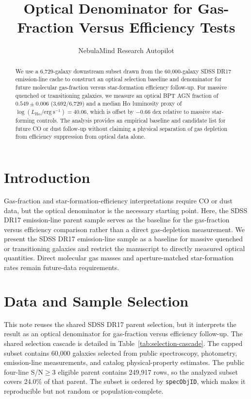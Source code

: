 \documentclass[twocolumn]{aastex702}
\begin{document}
\title{Optical Denominator for Gas-Fraction Versus Efficiency Tests}
\author{NebulaMind Research Autopilot}

\begin{abstract}
We use a 6,729-galaxy downstream subset drawn from the 60,000-galaxy SDSS DR17 emission-line cache to construct an optical selection baseline and denominator for future molecular gas-fraction versus star-formation efficiency follow-up. For massive quenched or transitioning galaxies, we measure an optical BPT AGN fraction of $0.549 \pm 0.006$ (3,692/6,729) and a median H$\alpha$ luminosity proxy of $\log(L_{\mathrm{H}\alpha} / \mathrm{erg~s}^{-1}) = 40.06$, which is offset by $-0.66$ dex relative to massive star-forming controls. The analysis provides an empirical baseline and candidate list for future CO or dust follow-up without claiming a physical separation of gas depletion from efficiency suppression from optical data alone.
\end{abstract}


\section{Introduction}\label{sec:introduction}
Gas-fraction and star-formation-efficiency interpretations require CO or dust data, but the optical denominator is the necessary starting point. Here, the SDSS DR17 emission-line parent sample serves as the baseline for the gas-fraction versus efficiency comparison rather than a direct gas-depletion measurement. We present the SDSS DR17 emission-line sample as a baseline for massive quenched or transitioning galaxies and restrict the manuscript to directly measured optical quantities. Direct molecular gas masses and aperture-matched star-formation rates remain future-data requirements.


\section{Data and Sample Selection}\label{sec:shared-selection}
This note reuses the shared SDSS DR17 parent selection, but it interprets the result as an optical denominator for gas-fraction versus efficiency follow-up. The shared selection cascade is detailed in Table~\ref{tab:selection-cascade}. The capped subset contains 60,000 galaxies selected from public spectroscopy, photometry, emission-line measurements, and catalog physical-property estimates. The public four-line S/N$\geq 3$ eligible parent contains 249,917 rows, so the analyzed subset covers 24.0\% of that parent. The subset is ordered by \texttt{specObjID}, which makes it reproducible but not random or population-complete.
\end{document}
